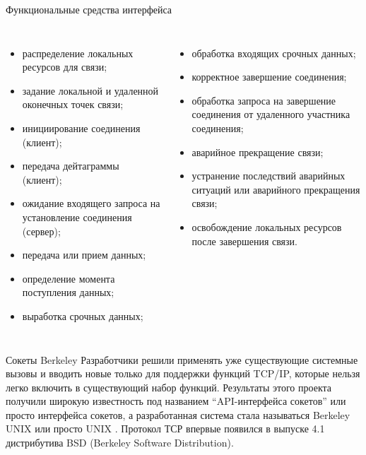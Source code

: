 \begin{frame}{Функциональные средства интерфейса}
\scriptsize
	\begin{columns}
	\begin{itemize}
		\item распределение локальных ресурсов для связи; \pause
		\item задание локальной и удаленной оконечных точек связи; \pause
		\item инициирование соединения (клиент); \pause
		\item передача дейтаграммы (клиент); \pause
		\item ожидание входящего запроса на установление соединения (сервер); \pause
		\item передача или прием данных; \pause
		\item определение момента поступления данных; \pause
		\item выработка срочных данных; \pause
	\end{itemize}
	\begin{itemize}
		\item обработка входящих срочных данных; \pause
		\item корректное завершение соединения; \pause
		\item обработка запроса на завершение соединения от удаленного участника соединения; \pause
		\item аварийное прекращение связи; \pause
		\item устранение последствий аварийных ситуаций или аварийного прекращения связи; \pause
		\item освобождение локальных ресурсов после завершения связи.
	\end{itemize}
\end{columns}
\normalsize
\end{frame}

\begin{frame}{Сокеты Berkeley}
Разработчики решили применять уже существующие системные вызовы и вводить новые только для поддержки функций TCP/IP,  которые нельзя легко включить в существующий набор функций. Результаты этого проекта получили широкую известность под названием “API-интерфейса сокетов” или просто интерфейса сокетов,  а разработанная система стала называться Berkeley UNIX или просто UNIX . Протокол ТСР впервые появился в выпуске 4.1 дистрибутива BSD (Berkeley Software Distribution).
\end{frame}

